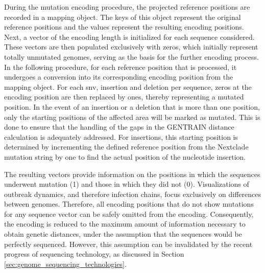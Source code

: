 During the mutation encoding procedure, the projected reference positions are recorded in a mapping object. The keys of this object represent the original reference positions and the values represent the resulting encoding positions.
Next, a vector of the encoding length is initialized for each sequence considered. These vectors are then populated exclusively with zeros, which initially represent totally unmutated genomes, serving as the basis for the further encoding process.
In the following procedure, for each reference position that is processed, it undergoes a conversion into its corresponding encoding position from the mapping object. For each \acrshort{snv}, insertion and deletion per sequence, zeros at the encoding position are then replaced by ones, thereby representing a mutated position. In the event of an insertion or a deletion that is more than one position, only the starting positions of the affected area will be marked as mutated. This is done to ensure that the handling of the gaps in the GENTRAIN distance calculation is adequately addressed. For insertions, this starting position is determined by incrementing the defined reference position from the Nextclade mutation string by one to find the actual position of the nucleotide insertion.

The resulting vectors provide information on the positions in which the sequences underwent mutation (1) and those in which they did not (0). Visualizations of outbreak dynamics, and therefore infection chains, focus exclusively on differences between genomes. Therefore, all encoding positions that do not show mutations for any sequence vector can be safely omitted from the encoding. Consequently, the encoding is reduced to the maximum amount of information necessary to obtain genetic distances, under the assumption that the sequences would be perfectly sequenced. However, this assumption can be invalidated by the recent progress of sequencing technology, as discussed in Section \ref{sec:genome_sequencing_technologies}.

